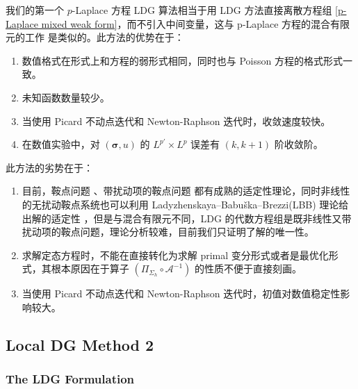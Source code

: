我们的第一个 \(p\)-Laplace 方程 LDG 算法相当于用 LDG 方法直接离散方程组 \eqref{p-Laplace mixed weak form}，而不引入中间变量，这与 p-Laplace 方程的混合有限元的工作 \cite{10.1093/imanum/18.1.121, 10.1216/camq/1008957338, 10.1016/j.cma.2006.11.023} 是类似的。此方法的优势在于：
\begin{enumerate}
	\item 数值格式在形式上和方程的弱形式相同，同时也与 Poisson 方程的格式形式一致。
	\item 未知函数数量较少。
	\item 当使用 Picard 不动点迭代和 Newton-Raphson 迭代时，收敛速度较快。
	\item 在数值实验中，对 \(\left(\bm\sigma, u\right)\) 的 \(L^{p'} \times L^{p}\) 误差有 \(\left(k, k+1\right)\) 阶收敛阶。
\end{enumerate}
此方法的劣势在于：
\begin{enumerate}
	\item 目前，鞍点问题 \cite{10.1007/BF02165003, 10.1051/m2an/197408R201291, 10.1137/0719021}、带扰动项的鞍点问题 \cite{10.1137/S0895479802410827, 10.1090/mcom/3795} 都有成熟的适定性理论，同时非线性的无扰动鞍点系统也可以利用 Ladyzhenskaya–Babu\v{s}ka–Brezzi(LBB) 理论给出解的适定性 \cite{10.4171/zaa/1107}，但是与混合有限元不同，LDG 的代数方程组是既非线性又带扰动项的鞍点问题，理论分析较难，目前我们只证明了解的唯一性。
	\item 求解定态方程时，不能在直接转化为求解 primal 变分形式或者是最优化形式，其根本原因在于算子 \(\left(\Pi_{\Sigma_{h}}\circ \mathcal{A}^{-1}\right)\) 的性质不便于直接刻画。
	\item 当使用 Picard 不动点迭代和 Newton-Raphson 迭代时，初值对数值稳定性影响较大。
\end{enumerate}







\subsection{Local DG Method 2} %

\subsubsection{The LDG Formulation}

